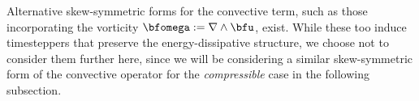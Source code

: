     \begin{remark}
        Alternative skew-symmetric forms for the convective term, such as those incorporating the vorticity $\bfomega  :=  \nabla\wedge\bfu$, exist. While these too induce timesteppers that preserve the energy-dissipative structure, we choose not to consider them further here, since we will be considering a similar skew-symmetric form of the convective operator for the \emph{compressible} case in the following subsection.
    \end{remark}

    \begin{remark}
    \end{remark}

    \line

